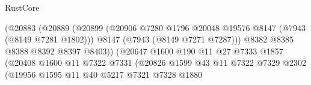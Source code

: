 \begin{lexlean}{RustCore}
\begin{coremodule}
                                              (@20883
                                                (@20889
                                                  (@20899
                                                    (@20906
                                                      @7280
                                                      @1796
                                                      @20048
                                                      @19576
                                                      @8147
                                                      (@7943 (@8149 @7281 @1802)))
                                                    @8147
                                                    (@7943 (@8149 @7271 @7287)))
                                                  @8382
                                                  @8385
                                                  @8388
                                                  @8392
                                                  @8397
                                                  @8403))
                                              (@20647
                                                @1600
                                                @190
                                                @11
                                                @27
                                                @7333
                                                @1857
                                                (@20408
                                                  @1600
                                                  @11
                                                  @7322
                                                  @7331
                                                  (@20826
                                                    @1599
                                                    @43
                                                    @11
                                                    @7322
                                                    @7329
                                                    @2302
                                                    (@19956
                                                      @1595
                                                      @11
                                                      @40
                                                      @5217
                                                      @7321
                                                      @7328
                                                      @1880

\end{coremodule}
\end{lexlean}
